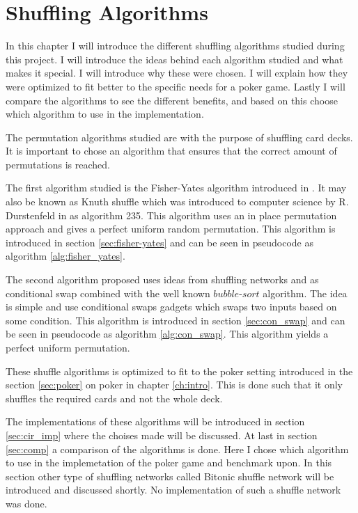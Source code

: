 \documentclass[twoside,11pt,openright]{report}
\begin{document}

\chapter{Shuffling Algorithms}
\label{ch:shuffle}
In this chapter I will introduce the different shuffling algorithms studied during this project. I will introduce the ideas behind each algorithm studied and what makes it special. I will introduce why these were chosen. I will explain how they were optimized to fit better to the specific needs for a poker game. Lastly I will compare the algorithms to see the different benefits, and based on this choose which algorithm to use in the implementation.

The permutation algorithms studied are with the purpose of shuffling card decks. It is important to chose an algorithm that ensures that the correct amount of permutations is reached.

The first algorithm studied is the Fisher-Yates algorithm introduced in . It may also be known as Knuth shuffle which was introduced to computer science by R. Durstenfeld in  as algorithm 235. This algorithm uses an in place permutation approach and gives a perfect uniform random permutation. This algorithm is introduced in section \ref{sec:fisher-yates} and can be seen in pseudocode as algorithm \ref{alg:fisher_yates}.

The second algorithm proposed uses ideas from shuffling networks and  as conditional swap combined with the well known $bubble\text{-}sort$ algorithm. The idea is simple and use conditional swaps gadgets which swaps two inputs based on some condition. This algorithm is introduced in section \ref{sec:con_swap} and can be seen in pseudocode as algorithm \ref{alg:con_swap}. This algorithm yields a perfect uniform permutation.

These shuffle algorithms is optimized to fit to the poker setting introduced in the section \ref{sec:poker} on poker in chapter \ref{ch:intro}. This is done such that it only shuffles the required cards and not the whole deck.

The implementations of these algorithms will be introduced in section \ref{sec:cir_imp} where the choises made will be discussed. At last in section \ref{sec:comp} a comparison of the algorithms is done. Here I chose which algorithm to use in the implemetation of the poker game and benchmark upon. In this section other type of shuffling networks called Bitonic shuffle network will be introduced and discussed shortly. No implementation of such a shuffle network was done.
\end{document}
